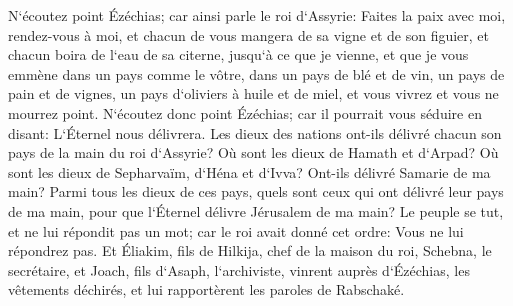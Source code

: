 \verse N`écoutez point Ézéchias; car ainsi parle le roi d`Assyrie: Faites la paix avec moi, rendez-vous à moi, et chacun de vous mangera de sa vigne et de son figuier, et chacun boira de l`eau de sa citerne, 
\verse jusqu`à ce que je vienne, et que je vous emmène dans un pays comme le vôtre, dans un pays de blé et de vin, un pays de pain et de vignes, un pays d`oliviers à huile et de miel, et vous vivrez et vous ne mourrez point. N`écoutez donc point Ézéchias; car il pourrait vous séduire en disant: L`Éternel nous délivrera. 
\verse Les dieux des nations ont-ils délivré chacun son pays de la main du roi d`Assyrie? 
\verse Où sont les dieux de Hamath et d`Arpad? Où sont les dieux de Sepharvaïm, d`Héna et d`Ivva? Ont-ils délivré Samarie de ma main? 
\verse Parmi tous les dieux de ces pays, quels sont ceux qui ont délivré leur pays de ma main, pour que l`Éternel délivre Jérusalem de ma main? 
\verse Le peuple se tut, et ne lui répondit pas un mot; car le roi avait donné cet ordre: Vous ne lui répondrez pas. 
\verse Et Éliakim, fils de Hilkija, chef de la maison du roi, Schebna, le secrétaire, et Joach, fils d`Asaph, l`archiviste, vinrent auprès d`Ézéchias, les vêtements déchirés, et lui rapportèrent les paroles de Rabschaké. 

